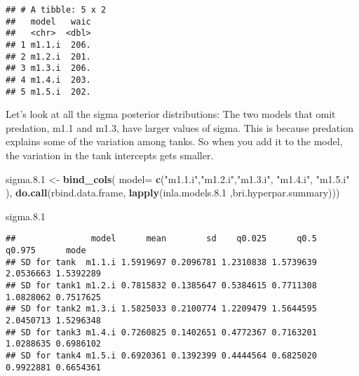 \documentclass[
]{article}
\newenvironment{Shaded}{\begin{snugshade}}{\end{snugshade}}
\newcommand{\DataTypeTok}[1]{\textcolor[rgb]{0.13,0.29,0.53}{#1}}
\newcommand{\FloatTok}[1]{\textcolor[rgb]{0.00,0.00,0.81}{#1}}
\newcommand{\KeywordTok}[1]{\textcolor[rgb]{0.13,0.29,0.53}{\textbf{#1}}}
\newcommand{\NormalTok}[1]{#1}
\newcommand{\StringTok}[1]{\textcolor[rgb]{0.31,0.60,0.02}{#1}}
\begin{document}
\begin{verbatim}
## # A tibble: 5 x 2
##   model   waic
##   <chr>  <dbl>
## 1 m1.1.i  206.
## 2 m1.2.i  201.
## 3 m1.3.i  206.
## 4 m1.4.i  203.
## 5 m1.5.i  202.
\end{verbatim}

Let's look at all the sigma posterior distributions: The two models that
omit predation, m1.1 and m1.3, have larger values of sigma. This is
because predation explains some of the variation among tanks. So when
you add it to the model, the variation in the tank intercepts gets
smaller.

\begin{Shaded}
\begin{Highlighting}[]
\NormalTok{sigma.}\FloatTok{8.1}\NormalTok{ <-}\StringTok{ }\KeywordTok{bind_cols}\NormalTok{( }\DataTypeTok{model=} \KeywordTok{c}\NormalTok{(}\StringTok{"m1.1.i"}\NormalTok{,}\StringTok{"m1.2.i"}\NormalTok{,}\StringTok{"m1.3.i"}\NormalTok{, }\StringTok{"m1.4.i"}\NormalTok{, }\StringTok{"m1.5.i"}\NormalTok{ ), }\KeywordTok{do.call}\NormalTok{(rbind.data.frame, }\KeywordTok{lapply}\NormalTok{(inla.models.}\FloatTok{8.1}\NormalTok{ ,bri.hyperpar.summary)))}


\NormalTok{sigma.}\FloatTok{8.1}
\end{Highlighting}
\end{Shaded}

\begin{verbatim}
##               model      mean        sd    q0.025      q0.5    q0.975      mode
## SD for tank  m1.1.i 1.5919697 0.2096781 1.2310838 1.5739639 2.0536663 1.5392289
## SD for tank1 m1.2.i 0.7815832 0.1385647 0.5384615 0.7711308 1.0828062 0.7517625
## SD for tank2 m1.3.i 1.5825033 0.2100774 1.2209479 1.5644595 2.0450713 1.5296348
## SD for tank3 m1.4.i 0.7260825 0.1402651 0.4772367 0.7163201 1.0288635 0.6986102
## SD for tank4 m1.5.i 0.6920361 0.1392399 0.4444564 0.6825020 0.9922881 0.6654361
\end{verbatim}
\end{document}

